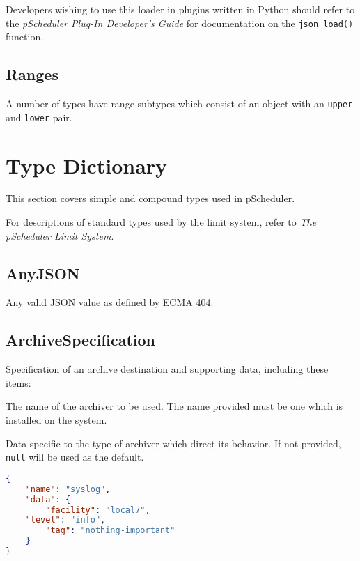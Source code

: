 \documentclass[10pt]{article}
\begin{document}
Developers wishing to use this loader in plugins written in Python
should refer to the {\it pScheduler Plug-In Developer's Guide} for
documentation on the {\tt json_load()} function.  



\subsection{Ranges}\label{ranges}
A number of types have range subtypes which consist of an object with
an {\tt upper} and {\tt lower} pair.







%
%

\section{Type Dictionary}

This section covers simple and compound types used in pScheduler.

For descriptions of standard types used by the limit system, refer to
{\it The pScheduler Limit System}.


\subsection{AnyJSON}
Any valid JSON value as defined by ECMA 404.



\subsection{ArchiveSpecification}
Specification of an archive destination and supporting data, including these items:

 The name of the archiver to be used.  The
name provided must be one which is installed on the system.

 Data specific to the type of archiver which
direct its behavior.  If not provided, {\tt null} will be used as the
default.

\example
\begin{lstlisting}[language=json]
{
    "name": "syslog",
    "data": {
        "facility": "local7",
	"level": "info",
        "tag": "nothing-important"
    }
}
\end{lstlisting}
\end{document}
